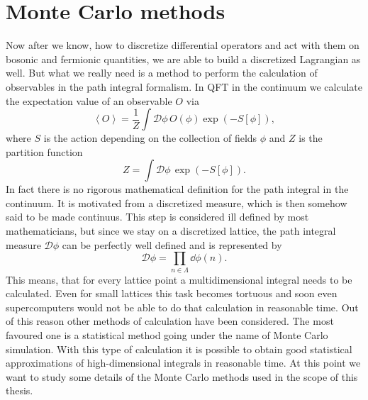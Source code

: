 \section{Monte Carlo methods}
Now after we know, how to discretize differential operators and act with them on bosonic and fermionic quantities, we are able to build a discretized Lagrangian as well. But what we really need is a method to perform the calculation of observables in the path integral formalism. In QFT in the continuum we calculate the expectation value of an observable $O$ via \cite{peskin}
\begin{equation}
\left\langle O \right\rangle = \dfrac{1}{Z} \int \mathcal{D} \mathit{\phi}\, O(\mathit{\phi})\exp\left(-S\left[\mathit{\phi}\right]\right),
\label{PI_continuum}
\end{equation}
where $S$ is the  action depending on the collection of fields $\phi$ and $Z$ is the partition function
\begin{equation}
Z =  \int \mathcal{D} \mathit{\phi}\, \exp\left(-S\left[\mathit{\phi}\right]\right).
\end{equation}
In fact there is no rigorous mathematical definition for the path integral in the continuum. It is motivated from a discretized measure, which is then somehow said to be made continuus. This step is considered ill defined by most mathematicians, but since we stay on a discretized lattice, the path integral measure $\mathcal{D} \mathit{\phi}$ can be perfectly well defined and is represented by
\begin{equation}
\mathcal{D} \mathit{\phi} = \prod\limits_{n \in \mathit{\Lambda}} \dd \phi(n).
\end{equation}
This means, that for every lattice point a multidimensional integral needs to be calculated. Even for small lattices this task becomes tortuous and soon even supercomputers would not be able to do that calculation in reasonable time. Out of this reason other methods of calculation have been considered. The most favoured one is a statistical method going under the name of Monte Carlo simulation. With this type of calculation it is possible to obtain good statistical approximations of high-dimensional integrals in reasonable time. At this point we want to study some details of the Monte Carlo methods used in the scope of this thesis.
%
%
